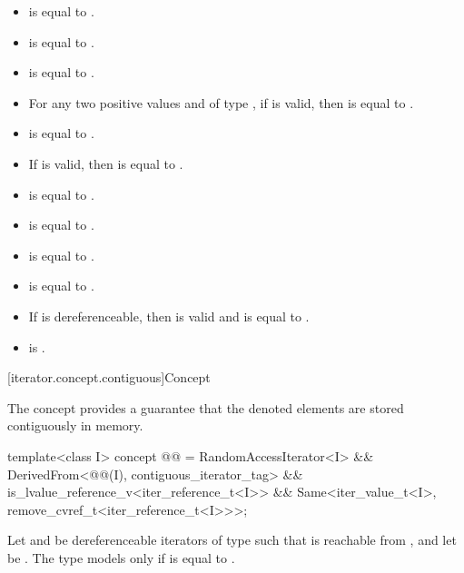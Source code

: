 \begin{itemize}
\item {} is equal to .
\item {} is equal to .
\item {} is equal to .
\item For any two positive values
   and  of type ,
  if  is valid, then
   is equal to .
\item {} is equal to .
\item If  is valid, then
   is equal to .
\item {} is equal to .
\item {} is equal to .
\item {} is equal to .
\item {} is equal to .
\item If  is dereferenceable, then
   is valid and is equal to .
\item {} is .
\end{itemize}

[iterator.concept.contiguous]{Concept }

\pnum
The  concept provides a guarantee that
the denoted elements are stored contiguously in memory.

%
\begin{codeblock}
template<class I>
  concept @@ =
    RandomAccessIterator<I> &&
    DerivedFrom<@@(I), contiguous_iterator_tag> &&
    is_lvalue_reference_v<iter_reference_t<I>> &&
    Same<iter_value_t<I>, remove_cvref_t<iter_reference_t<I>>>;
\end{codeblock}

\pnum
Let  and  be dereferenceable iterators of type 
such that  is reachable from ,
and let  be .
The type  models  only if
is equal to
.

